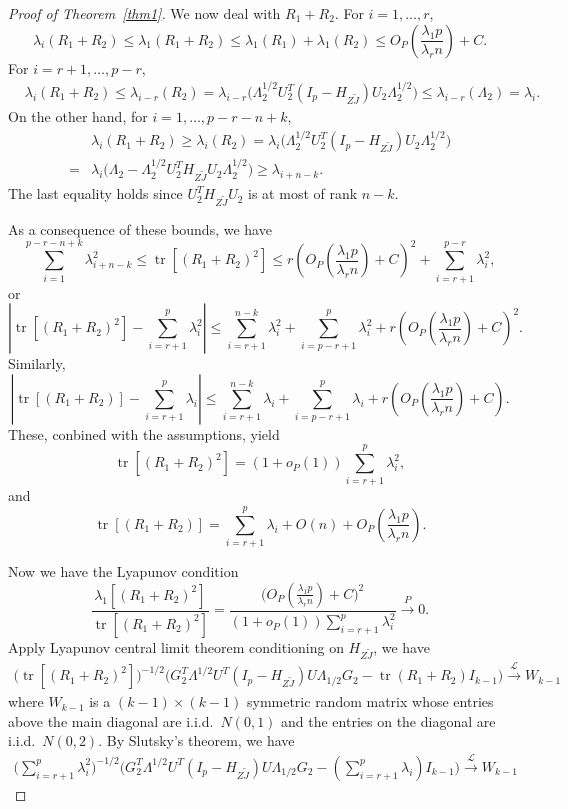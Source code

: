 \documentclass[review]{elsarticle}
\DeclareMathOperator{\mytr}{tr}
\theoremstyle{plain}
\theoremstyle{definition}
\theoremstyle{remark}
\begin{document}
\begin{proof}[\textrm{Proof of Theorem~\ref{thm1}}]
We now deal with $R_1+R_2$.
For $i=1,\ldots, r$,
$$
\lambda_i(R_1+R_2)\leq
\lambda_1(R_1+R_2)\leq \lambda_1(R_1)+\lambda_1(R_2)\leq O_P(\frac{\lambda_1 p}{\lambda_r n}) + C.
$$
For $i=r+1,\ldots, p-r$,
$$
\begin{aligned}
    &\lambda_i(R_1+R_2)\leq \lambda_{i-r}(R_2)
    =
     \lambda_{i-r}\big( \Lambda_2^{1/2} U_2^T (I_p-H_{Z\tilde{J}})U_2\Lambda_2^{1/2}\big)
    \leq
    \lambda_{i-r}(\Lambda_2)
    =\lambda_i.
\end{aligned}
$$
On the other hand,
for $i=1,\ldots, p-r-n+k$,
$$
\begin{aligned}
    &\lambda_i(R_1+R_2)\geq \lambda_i(R_2)
    =
     \lambda_i\big( \Lambda_2^{1/2} U_2^T (I_p-H_{Z\tilde{J}})U_2\Lambda_2^{1/2}\big)\\
    =&
    \lambda_i\big( \Lambda_2- \Lambda_2^{1/2} U_2^T H_{Z\tilde{J}}U_2 \Lambda_2^{1/2}\big)
    \geq 
    \lambda_{i+n-k}.
\end{aligned}
$$
The last equality holds since $U_2^T H_{Z\tilde{J}}U_2$ is at most of rank $n-k$.

As a consequence of these bounds, we have
$$
    \sum_{i=1}^{p-r-n+k}\lambda_{i+n-k}^2\leq \mytr [(R_1+R_2)^2]\leq  r(O_P(\frac{\lambda_1 p}{\lambda_r n})+C)^2+\sum_{i=r+1}^{p-r}\lambda_i^2,
$$
or
$$
    | \mytr [(R_1+R_2)^2]-\sum_{i=r+1}^{p}\lambda_{i}^2|\leq 
\sum_{i=r+1}^{n-k}\lambda_{i}^2+
\sum_{i=p-r+1}^{p}\lambda_{i}^2
+
    r(O_P(\frac{\lambda_1 p}{\lambda_r n})+C)^2.
$$
Similarly,
$$
    | \mytr [(R_1+R_2)]-\sum_{i=r+1}^{p}\lambda_{i}|\leq 
\sum_{i=r+1}^{n-k}\lambda_{i}+
\sum_{i=p-r+1}^{p}\lambda_{i}
+
    r(O_P(\frac{\lambda_1 p}{\lambda_r n})+C).
$$
These, conbined with the assumptions, yield
$$
     \mytr [(R_1+R_2)^2]=(1+o_P(1))\sum_{i=r+1}^{p}\lambda_{i}^2,
$$
and
$$
     \mytr [(R_1+R_2)]=\sum_{i=r+1}^{p}\lambda_{i}+O(n)+O_P(\frac{\lambda_1 p}{\lambda_r n}).
$$

Now we have the Lyapunov condition
$$
\frac{\lambda_1[(R_1+R_2)^2]}{
    \mytr [(R_1+R_2)^2]
}
=
\frac{
    \big( O_P(\frac{\lambda_1 p}{\lambda_r n})+C\big)^2
}{
(1+o_P(1))\sum_{i=r+1}^{p}\lambda_{i}^2
}
\xrightarrow{P} 0.
$$
Apply Lyapunov central limit theorem conditioning on $H_{Z\tilde{J}}$, we have
$$
\begin{aligned}
    \big(\mytr[(R_1+R_2)^2]\big)^{-1/2}
    \big( G_2^T \Lambda^{1/2}U^T (I_p-H_{Z\tilde{J}})U\Lambda_{1/2}G_2-\mytr(R_1+R_2) I_{k-1} \big)
    \xrightarrow{\mathcal{L}} W_{k-1}
\end{aligned}
$$
where $W_{k-1}$ is a $(k-1)\times(k-1)$ symmetric random matrix whose entries above the main diagonal are i.i.d.\ $N(0,1)$ and the entries on the diagonal are i.i.d.\ $N(0,2)$.
By Slutsky's theorem, we have
$$
\begin{aligned}
    \big(\sum_{i=r+1}^p \lambda_i^2\big)^{-1/2}
    \big( G_2^T \Lambda^{1/2}U^T (I_p-H_{Z\tilde{J}})U\Lambda_{1/2}G_2-(\sum_{i=r+1}^p \lambda_i)I_{k-1} \big)
    \xrightarrow{\mathcal{L}}W_{k-1}
\end{aligned}
$$



\end{proof}
\end{document}
